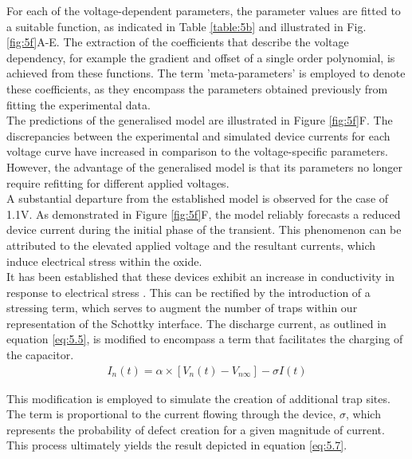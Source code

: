 \noindent For each of the voltage-dependent parameters, the parameter values are fitted to a suitable function, as indicated in Table \ref{table:5b} and illustrated in Fig. \ref{fig:5f}A-E. The extraction of the coefficients that describe the voltage dependency, for example the gradient and offset of a single order polynomial, is achieved from these functions. The term 'meta-parameters' is employed to denote these coefficients, as they encompass the parameters obtained previously from fitting the experimental data.\\

\noindent The predictions of the generalised model are illustrated in Figure \ref{fig:5f}F. The discrepancies between the experimental and simulated device currents for each voltage curve have increased in comparison to the voltage-specific parameters. However, the advantage of the generalised model is that its parameters no longer require refitting for different applied voltages.\\

\noindent A substantial departure from the established model is observed for the case of 1.1V. As demonstrated in Figure \ref{fig:5f}F, the model reliably forecasts a reduced device current during the initial phase of the transient. This phenomenon can be attributed to the elevated applied voltage and the resultant currents, which induce electrical stress within the oxide. \\

\noindent It has been established that these devices exhibit an increase in conductivity in response to electrical stress \cite{mannion2023unipolar}. This can be rectified by the introduction of a stressing term, which serves to augment the number of traps within our representation of the Schottky interface. The discharge current, as outlined in equation \ref{eq:5.5}, is modified to encompass a term that facilitates the charging of the capacitor. 
\begin{align}
    I_n(t) = \alpha \times \left[ V_n(t) - V_{n\infty} \right] -\sigma I(t) \label{eq:5.7} 
\end{align}

\noindent This modification is employed to simulate the creation of additional trap sites. The term is proportional to the current flowing through the device, $\sigma$, which represents the probability of defect creation for a given magnitude of current. This process ultimately yields the result depicted in equation \ref{eq:5.7}.\\

